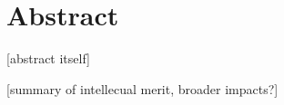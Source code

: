 

% 

\section{Abstract}

[abstract itself]

[summary of intellecual merit, broader impacts?]


% 

